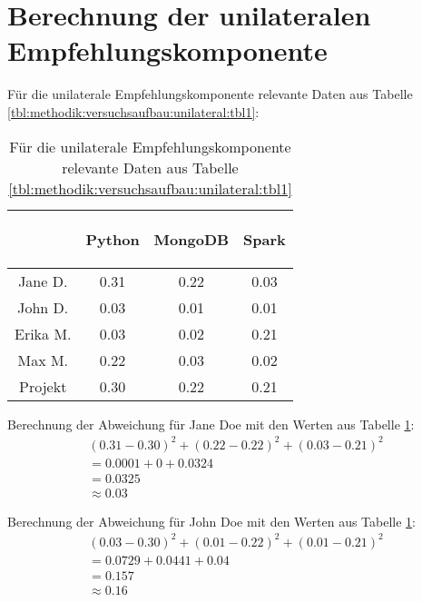 \section{Berechnung der unilateralen Empfehlungskomponente}
\label{ch:nebenrechnungen:unilateral}
Für die unilaterale Empfehlungskomponente relevante Daten aus Tabelle \ref{tbl:methodik:versuchsaufbau:unilateral:tbl1}:

\begin{table}[h]
	\centering
	\begin{tabular}{c|c|c|c}
		& \begin{sideways}Python\end{sideways} & \begin{sideways}MongoDB\end{sideways} & \begin{sideways}Spark\end{sideways} \\
		\hline
		Jane D.  & 0.31 & 0.22 & 0.03\\
		John D.  & 0.03 & 0.01 & 0.01\\
		Erika M. & 0.03 & 0.02 & 0.21\\
		Max M.   & 0.22 & 0.03 & 0.02\\
		Projekt  & 0.30 & 0.22 & 0.21\\
	\end{tabular}
	\caption{Für die unilaterale Empfehlungskomponente relevante Daten aus Tabelle \ref{tbl:methodik:versuchsaufbau:unilateral:tbl1}}
	\label{tbl:nebenrechnungen:unilateral:tbl1}
\end{table}

Berechnung der Abweichung für Jane Doe mit den Werten aus Tabelle \ref{tbl:nebenrechnungen:unilateral:tbl1}:
\begin{gather}
	\nonumber (0.31-0.30)^2 + (0.22-0.22)^2 + (0.03-0.21)^2\\
	\nonumber = 0.0001 + 0 + 0.0324\\
	\nonumber = 0.0325\\
	\approx 0.03
	\label{frml:nebenrechnungen:unilateral:jane}
\end{gather}

Berechnung der Abweichung für John Doe mit den Werten aus Tabelle \ref{tbl:nebenrechnungen:unilateral:tbl1}:
\begin{gather}
	\nonumber (0.03-0.30)^2 + (0.01-0.22)^2 + (0.01-0.21)^2\\
	\nonumber = 0.0729 + 0.0441 + 0.04\\
	\nonumber = 0.157\\
	\approx 0.16
	\label{frml:nebenrechnungen:unilateral:john}
\end{gather}

